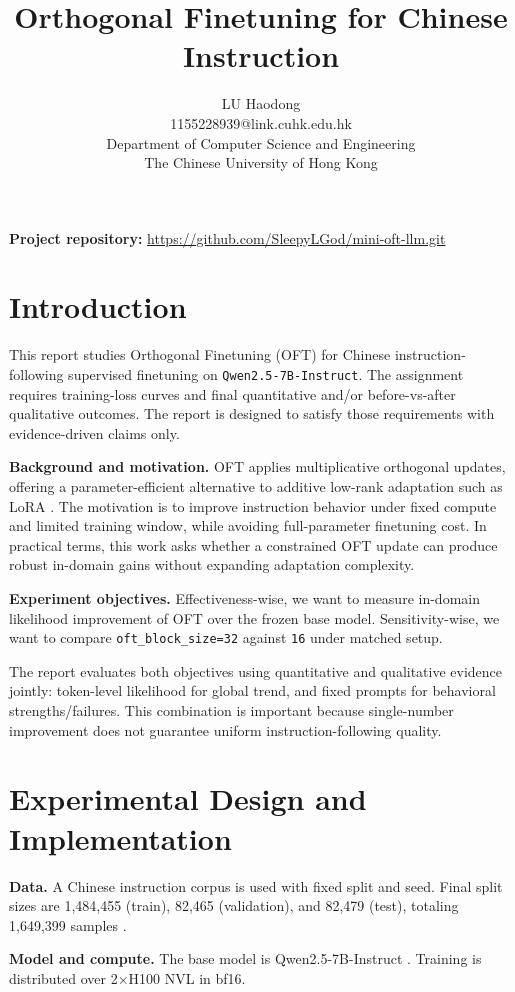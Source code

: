 \documentclass{article}
\title{Orthogonal Finetuning for Chinese Instruction}
\author{
  LU Haodong \\
  1155228939@link.cuhk.edu.hk\\
  Department of Computer Science and Engineering\\
  The Chinese University of Hong Kong
}
\begin{document}
\maketitle
\noindent\textbf{Project repository:} \url{https://github.com/SleepyLGod/mini-oft-llm.git}

\section{Introduction}
This report studies Orthogonal Finetuning (OFT) for Chinese instruction-following supervised finetuning on \texttt{Qwen2.5-7B-Instruct}. The assignment requires training-loss curves and final quantitative and/or before-vs-after qualitative outcomes. The report is designed to satisfy those requirements with evidence-driven claims only.

\textbf{Background and motivation.} OFT applies multiplicative orthogonal updates, offering a parameter-efficient alternative to additive low-rank adaptation such as LoRA \citep{qiu2023oft,hu2021lora}. The motivation is to improve instruction behavior under fixed compute and limited training window, while avoiding full-parameter finetuning cost. In practical terms, this work asks whether a constrained OFT update can produce robust in-domain gains without expanding adaptation complexity.

\textbf{Experiment objectives.} Effectiveness-wise, we want to measure in-domain likelihood improvement of OFT over the frozen base model. Sensitivity-wise, we want to compare \texttt{oft\_block\_size=32} against \texttt{16} under matched setup.

The report evaluates both objectives using quantitative and qualitative evidence jointly: token-level likelihood for global trend, and fixed prompts for behavioral strengths/failures. This combination is important because single-number improvement does not guarantee uniform instruction-following quality.

\section{Experimental Design and Implementation}
\textbf{Data.} A Chinese instruction corpus is used with fixed split and seed. Final split sizes are 1,484,455 (train), 82,465 (validation), and 82,479 (test), totaling 1,649,399 samples \citep{firefly_dataset}.

\textbf{Model and compute.} The base model is Qwen2.5-7B-Instruct \citep{qwen25_report}. Training is distributed over 2$\times$H100 NVL in bf16.
\end{document}
